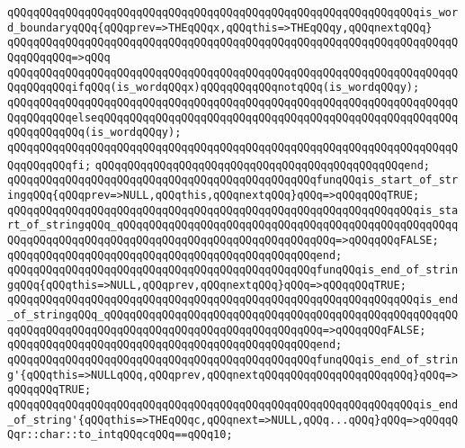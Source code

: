 \verb|qQQqqQQqqQQqqQQqqQQqqQQqqQQqqQQqqQQqqQQqqQQqqQQqqQQqqQQqqQQqqQQqis_word_boundaryqQQq{qQQqprev=>THEqQQqx,qQQqthis=>THEqQQqy,qQQqnextqQQq}|\newline
\verb|qQQqqQQqqQQqqQQqqQQqqQQqqQQqqQQqqQQqqQQqqQQqqQQqqQQqqQQqqQQqqQQqqQQqqQQqqQQqqQQq=>qQQq|\newline
\verb|qQQqqQQqqQQqqQQqqQQqqQQqqQQqqQQqqQQqqQQqqQQqqQQqqQQqqQQqqQQqqQQqqQQqqQQqqQQqqQQqifqQQq(is_wordqQQqx)qQQqqQQqqQQqnotqQQq(is_wordqQQqy);|\newline
\verb|qQQqqQQqqQQqqQQqqQQqqQQqqQQqqQQqqQQqqQQqqQQqqQQqqQQqqQQqqQQqqQQqqQQqqQQqqQQqqQQqelseqQQqqQQqqQQqqQQqqQQqqQQqqQQqqQQqqQQqqQQqqQQqqQQqqQQqqQQqqQQqqQQqqQQq(is_wordqQQqy);|\newline
\verb|qQQqqQQqqQQqqQQqqQQqqQQqqQQqqQQqqQQqqQQqqQQqqQQqqQQqqQQqqQQqqQQqqQQqqQQqqQQqqQQqfi;|\newline
\verb|qQQqqQQqqQQqqQQqqQQqqQQqqQQqqQQqqQQqqQQqqQQqqQQqend;|\newline
\newline
\verb|qQQqqQQqqQQqqQQqqQQqqQQqqQQqqQQqqQQqqQQqqQQqqQQqfunqQQqis_start_of_stringqQQq{qQQqprev=>NULL,qQQqthis,qQQqnextqQQq}qQQq=>qQQqqQQqTRUE;|\newline
\verb|qQQqqQQqqQQqqQQqqQQqqQQqqQQqqQQqqQQqqQQqqQQqqQQqqQQqqQQqqQQqqQQqis_start_of_stringqQQq_qQQqqQQqqQQqqQQqqQQqqQQqqQQqqQQqqQQqqQQqqQQqqQQqqQQqqQQqqQQqqQQqqQQqqQQqqQQqqQQqqQQqqQQqqQQqqQQqqQQqqQQq=>qQQqqQQqFALSE;|\newline
\verb|qQQqqQQqqQQqqQQqqQQqqQQqqQQqqQQqqQQqqQQqqQQqqQQqend;|\newline
\newline
\verb|qQQqqQQqqQQqqQQqqQQqqQQqqQQqqQQqqQQqqQQqqQQqqQQqfunqQQqis_end_of_stringqQQq{qQQqthis=>NULL,qQQqprev,qQQqnextqQQq}qQQq=>qQQqqQQqTRUE;|\newline
\verb|qQQqqQQqqQQqqQQqqQQqqQQqqQQqqQQqqQQqqQQqqQQqqQQqqQQqqQQqqQQqqQQqis_end_of_stringqQQq_qQQqqQQqqQQqqQQqqQQqqQQqqQQqqQQqqQQqqQQqqQQqqQQqqQQqqQQqqQQqqQQqqQQqqQQqqQQqqQQqqQQqqQQqqQQqqQQqqQQqqQQq=>qQQqqQQqFALSE;|\newline
\verb|qQQqqQQqqQQqqQQqqQQqqQQqqQQqqQQqqQQqqQQqqQQqqQQqend;|\newline
\newline
\verb|qQQqqQQqqQQqqQQqqQQqqQQqqQQqqQQqqQQqqQQqqQQqqQQqfunqQQqis_end_of_string'{qQQqthis=>NULLqQQq,qQQqprev,qQQqnextqQQqqQQqqQQqqQQqqQQqqQQq}qQQq=>qQQqqQQqTRUE;|\newline
\verb|qQQqqQQqqQQqqQQqqQQqqQQqqQQqqQQqqQQqqQQqqQQqqQQqqQQqqQQqqQQqqQQqis_end_of_string'{qQQqthis=>THEqQQqc,qQQqnext=>NULL,qQQq...qQQq}qQQq=>qQQqqQQqr::char::to_intqQQqcqQQq==qQQq10;|\newline
